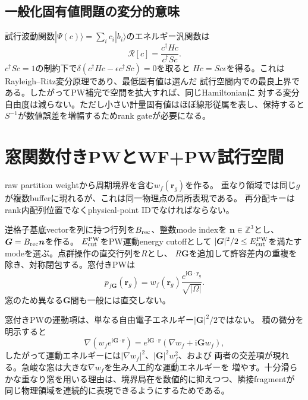 \documentclass[11pt,a4paper]{article}
\newcommand{\ii}{\mathrm i}
\begin{document}
\subsection{一般化固有値問題の変分的意味}
試行波動関数$|\Psi(c)\rangle=\sum_i c_i|b_i\rangle$のエネルギー汎関数は
\begin{equation}
 \mathcal R[c]=\frac{c^\dagger Hc}{c^\dagger Sc}.
\end{equation}
$c^\dagger Sc=1$の制約下で$\delta(c^\dagger Hc-\epsilon c^\dagger Sc)=0$を取ると
$Hc=Sc\epsilon$を得る。これはRayleigh--Ritz変分原理であり、最低固有値は選んだ
試行空間内での最良上界である。したがってPW補完で空間を拡大すれば、同じHamiltonianに
対する変分自由度は減らない。ただし小さい計量固有値はほぼ線形従属を表し、保持すると
$S^{-1}$が数値誤差を増幅するためrank gateが必要になる。

\section{窓関数付きPWとWF+PW試行空間}
raw partition weightから周期境界を含む$w_f(\boldsymbol r_g)$を作る。
重なり領域では同じ$g$が複数bufferに現れるが、これは同一物理点の局所表現である。
再分配キーはrank内配列位置でなくphysical-point IDでなければならない。

逆格子基底vectorを列に持つ行列を$B_{\rm rec}$、整数mode indexを
$\boldsymbol n\in\mathbb Z^3$とし、$\boldsymbol G=B_{\rm rec}\boldsymbol n$を作る。
$E_{\rm cut}^{\rm PW}$をPW運動energy cutoffとして
$|\boldsymbol G|^2/2\le E_{\rm cut}^{\rm PW}$を満たすmodeを選ぶ。点群操作の直交行列を$R$とし、
$R\boldsymbol G$を追加して許容差内の重複を除き、対称閉包する。窓付きPWは
\begin{equation}
 p_{f\boldsymbol G}(\boldsymbol r_g)=w_f(\boldsymbol r_g)
 \frac{e^{\ii\boldsymbol G\cdot\boldsymbol r_g}}{\sqrt{|\Omega|}}.
 \label{eq:wpw}
\end{equation}
窓のため異なる$\boldsymbol G$間も一般には直交しない。

窓付きPWの運動項は、単なる自由電子エネルギー$|\boldsymbol G|^2/2$ではない。
積の微分を明示すると
\begin{equation}
 \nabla\!\left(w_fe^{\ii\boldsymbol G\cdot\boldsymbol r}\right)
 =e^{\ii\boldsymbol G\cdot\boldsymbol r}
 \left(\nabla w_f+\ii\boldsymbol G w_f\right),
\end{equation}
したがって運動エネルギーには$|\nabla w_f|^2$、$|\boldsymbol G|^2w_f^2$、および
両者の交差項が現れる。急峻な窓は大きな$\nabla w_f$を生み人工的な運動エネルギーを
増やす。十分滑らかな重なり窓を用いる理由は、境界局在を数値的に抑えつつ、隣接fragmentが
同じ物理領域を連続的に表現できるようにするためである。
\end{document}
